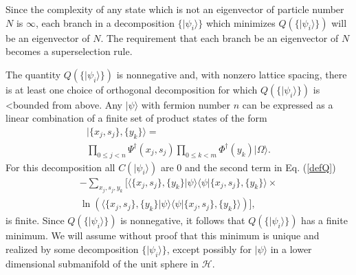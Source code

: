 \documentclass[12pt,amsmath,amssymb,onecolumn]{revtex4-2}
\begin{document}
Since the complexity of any state which is not an eigenvector of particle number $N$
is $\infty$, each branch in a decomposition $\{|\psi_i \rangle \}$ which minimizes
$Q( \{|\psi_i \rangle \})$ will be an eigenvector of $N$.
The requirement that each branch be an eigenvector of $N$
becomes a superselection rule.


The quantity $Q( \{|\psi_i \rangle \})$ is nonnegative and, with
nonzero lattice spacing, there is at least
one choice of orthogonal decomposition for which
$Q( \{|\psi_i \rangle \})$ is
<bounded from above.
Any $|\psi \rangle $ with fermion number $n$ can be expressed as a linear
combination of a finite set of product states of the form
\begin{multline}
\label{particlesatpoints}
|\{x_j, s_j\}, \{y_k\} \rangle  = \\ \prod_{0 \le j < n} \Psi^{\dagger}( x_j, s_j) \prod_{0 \le k < m} \Phi^{\dagger}( y_k) |\Omega \rangle .
\end{multline}
For this decomposition all $C( |\psi_i \rangle )$ are 0
and the second term in Eq. (\ref{defQ})
\begin{multline}
\label{pointstates1}
-\sum_{x_j,s_j, y_k} [ \langle  \{x_j,s_j\}, \{y_k\}|\psi \rangle  \langle \psi|\{x_j,s_j\},\{ y_k\} \rangle  \times \\
\ln ( \langle  \{x_j,s_j\}, \{y_k\}|\psi \rangle  \langle \psi|\{x_j,s_j\}, \{y_k\} \rangle )],
\end{multline}
is finite.
Since $Q( \{|\psi_i \rangle \})$ is nonnegative, it follows that $Q( \{|\psi_i \rangle \})$ has 
a finite minimum.
We will assume without proof that
this minimum is unique and realized by some
decomposition $\{ |\psi_i \rangle  \}$, except possibly for  $|\psi \rangle $ in a lower
dimensional submanifold of the unit sphere in $\mathcal{H}$.
\end{document}
